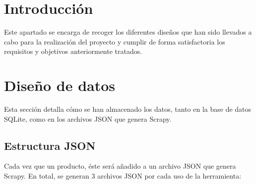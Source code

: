 
\section{Introducción}

Este apartado se encarga de recoger los diferentes diseños que han sido llevados a cabo para la realización del proyecto y cumplir de forma satisfactoria los requisitos y objetivos anteriormente tratados. 

\section{Diseño de datos}

Esta sección detalla cómo se han almacenado los datos, tanto en la base de datos SQLite, como en los archivos JSON que genera Scrapy.

\subsection{Estructura JSON}
Cada vez que  un producto, éste será añadido a un archivo JSON que genera Scrapy. En total, se generan 3 archivos JSON por cada uso de la herramienta:

